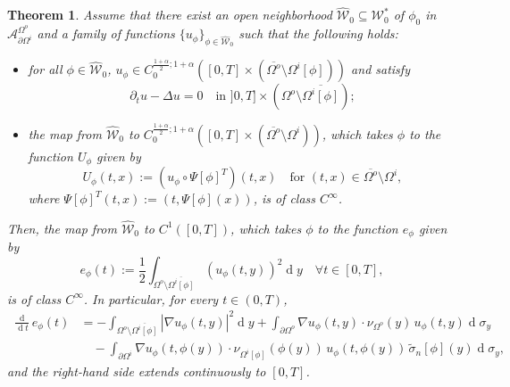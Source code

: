 \documentclass[10pt,a4paper]{amsart}
\newtheorem{theorem}{Theorem}
\renewcommand{\d}[1]{\ensuremath{\operatorname{d}\!{#1}}}
\begin{document}
\begin{theorem}\label{thm energy dependence abstract}
    Assume that there exist an open neighborhood $\widehat{\mathcal{W}}_0 \subseteq \mathcal{W}^\ast_0$ of $\phi_0$ in $\mathcal{A}^{\Omega^o}_{\partial\Omega^i}$ and a family of functions $\{ u_\phi \}_{\phi \in \widehat{\mathcal{W}}_0}$ such that the following holds:
    \begin{itemize}
        \item[(i)] for all $\phi \in \widehat{\mathcal{W}}_0$, $u_\phi \in C_{0}^{\frac{1+\alpha}{2}; 1+\alpha}([0,T] \times (\overline{\Omega^o} \setminus \Omega^i[\phi] ))$ and satisfy
        \begin{equation}\label{princeqpertu family}
            \partial_t u - \Delta u = 0  \quad \text{in } ]0,T] \times (\Omega^o \setminus \overline{\Omega^i[\phi]});
        \end{equation}

        \item[(ii)] the map from $\widehat{\mathcal{W}}_0$ to $C_{0}^{\frac{1+\alpha}{2}; 1+\alpha}([0,T] \times (\overline{\Omega^o} \setminus \Omega^i))$, which takes $\phi$ to the function $U_\phi$ given by 
        \begin{equation}\label{eq: U_phi := u_phi Psi phi}
        U_\phi(t,x):= \left( u_\phi \circ \Psi[\phi]^T \right) (t,x) \quad \text{for } (t,x) \in \overline{\Omega^o} \setminus \Omega^i,
        \end{equation}
        where $\Psi[\phi]^T(t,x):=(t,\Psi[\phi](x))$, is of class $C^\infty$.
    \end{itemize}
    Then, the map from $\widehat{\mathcal{W}}_0$ to $C^1([0,T])$, which takes $\phi$ to the function $e_\phi$ given by
    \begin{equation*}
    e_\phi(t) := \frac{1}{2} \int_{\Omega^o \setminus \overline{\Omega^i[\phi]}} (u_\phi(t,y))^2 \d y \quad \forall t \in [0,T],
    \end{equation*}
    is of class $C^\infty$. In particular, for every $t\in(0,T)$,
    \begin{equation}\label{eq: derivative of e general}
    \begin{aligned}
        \frac{\d{}}{\d t}e_\phi(t) &= - \int_{\Omega^o \setminus \overline{\Omega^i[\phi]}} |\nabla u_\phi(t,y)|^2 \d y + \int_{\partial\Omega^o} 
        \nabla u_\phi(t,y)\cdot \nu_{\Omega^o}(y) \, u_{\phi}(t,y) \d \sigma_y 
        \\
        & \quad
        - \int_{\partial\Omega^i} \nabla u_\phi(t,\phi(y))\cdot \nu_{\Omega^i[\phi]}(\phi(y)) \, u_\phi(t,\phi(y)) \, \tilde\sigma_n[\phi](y) \d\sigma_y,
    \end{aligned}
    \end{equation}
    and the right-hand side extends continuously to $[0,T]$.
\end{theorem}
\end{document}
